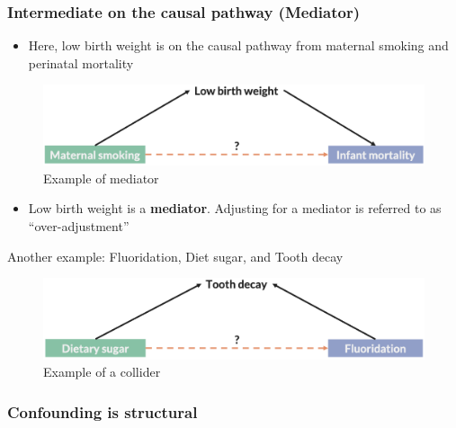 \documentclass[
]{book}
\providecommand{\tightlist}{%
  \setlength{\itemsep}{0pt}\setlength{\parskip}{0pt}}
\begin{document}
\hypertarget{intermediate-on-the-causal-pathway-mediator}{%
\subsubsection{Intermediate on the causal pathway (Mediator)}\label{intermediate-on-the-causal-pathway-mediator}}

\begin{itemize}
\tightlist
\item
  Here, low birth weight is on the causal pathway from maternal smoking and perinatal mortality
\end{itemize}

\begin{figure}

{\centering \includegraphics[width=1\linewidth]{img/confounding/mediator_example} 

}

\caption{Example of mediator}\label{fig:unnamed-chunk-12}
\end{figure}

\begin{itemize}
\tightlist
\item
  Low birth weight is a \textbf{mediator}. Adjusting for a mediator is referred to as ``over-adjustment''
\end{itemize}

Another example: Fluoridation, Diet sugar, and Tooth decay

\begin{figure}

{\centering \includegraphics[width=1\linewidth]{img/confounding/overadjusting_example} 

}

\caption{Example of a collider}\label{fig:unnamed-chunk-13}
\end{figure}

\hypertarget{confounding-is-structural}{%
\subsubsection{Confounding is structural}\label{confounding-is-structural}}
\end{document}
